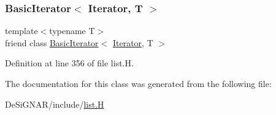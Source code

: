 \subsubsection{\texorpdfstring{Basic\+Iterator$<$ Iterator, T $>$}{BasicIterator< Iterator, T >}}
{\footnotesize\ttfamily template$<$typename T$>$ \\
friend class \hyperlink{class_designar_1_1_basic_iterator}{Basic\+Iterator}$<$ \hyperlink{class_designar_1_1_s_l_list_1_1_iterator}{Iterator}, T $>$\hspace{0.3cm}{\ttfamily [friend]}}



Definition at line 356 of file list.\+H.



The documentation for this class was generated from the following file\+:\begin{DoxyCompactItemize}
\item 
De\+Si\+G\+N\+A\+R/include/\hyperlink{list_8_h}{list.\+H}\end{DoxyCompactItemize}
